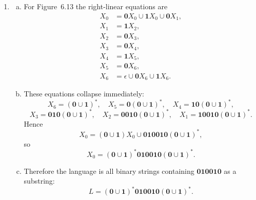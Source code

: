 \begin{enumerate}[{6.}1.]
\begin{enumerate}[(a)]
  \item The left-linear equations are
  \begin{align*}
    Y_0 &= \epsilon \cup Y_3\pmb{b},\\
    Y_1 &= Y_0\pmb{a} \cup Y_1\pmb{a},\\
    Y_2 &= Y_1\pmb{a} \cup Y_2\pmb{b},\\
    Y_3 &= Y_2\pmb{a} \cup Y_3(\pmb{a}\cup\pmb{b}).
  \end{align*}
  Solving gives
  \[
  Y_0=
  \bigl(\pmb{a}\pmb{a}^*\pmb{a}\pmb{b}^*\pmb{a}(\pmb{a}\cup\pmb{b})^*\pmb{b}\bigr)^*,
  \]
  \[
  Y_1=Y_0\pmb{a}\pmb{a}^*,
  \qquad
  Y_2=Y_0\pmb{a}\pmb{a}^*\pmb{a}\pmb{b}^*,
  \qquad
  Y_3=Y_0\pmb{a}\pmb{a}^*\pmb{a}\pmb{b}^*\pmb{a}(\pmb{a}\cup\pmb{b})^*.
  \]
\end{enumerate}

\item \begin{enumerate}[(a)]
  \item For Figure~6.13 the right-linear equations are
  \begin{align*}
    X_0 &= \pmb{0}X_0 \cup \pmb{1}X_0 \cup \pmb{0}X_1,\\
    X_1 &= \pmb{1}X_2,\\
    X_2 &= \pmb{0}X_3,\\
    X_3 &= \pmb{0}X_4,\\
    X_4 &= \pmb{1}X_5,\\
    X_5 &= \pmb{0}X_6,\\
    X_6 &= \epsilon \cup \pmb{0}X_6 \cup \pmb{1}X_6 .
  \end{align*}

  \item These equations collapse immediately:
  \[
  X_6=(\pmb{0}\cup\pmb{1})^*,
  \quad
  X_5=\pmb{0}(\pmb{0}\cup\pmb{1})^*,
  \quad
  X_4=\pmb{10}(\pmb{0}\cup\pmb{1})^*,
  \]
  \[
  X_3=\pmb{010}(\pmb{0}\cup\pmb{1})^*,
  \quad
  X_2=\pmb{0010}(\pmb{0}\cup\pmb{1})^*,
  \quad
  X_1=\pmb{10010}(\pmb{0}\cup\pmb{1})^*.
  \]
  Hence
  \[
  X_0=(\pmb{0}\cup\pmb{1})X_0 \cup \pmb{010010}(\pmb{0}\cup\pmb{1})^*,
  \]
  so
  \[
  X_0=(\pmb{0}\cup\pmb{1})^*\pmb{010010}(\pmb{0}\cup\pmb{1})^*.
  \]

  \item Therefore the language is all binary strings containing
  $\pmb{010010}$ as a substring:
  \[
  L=(\pmb{0}\cup\pmb{1})^*\pmb{010010}(\pmb{0}\cup\pmb{1})^*.
  \]


\end{enumerate}
\end{enumerate}
